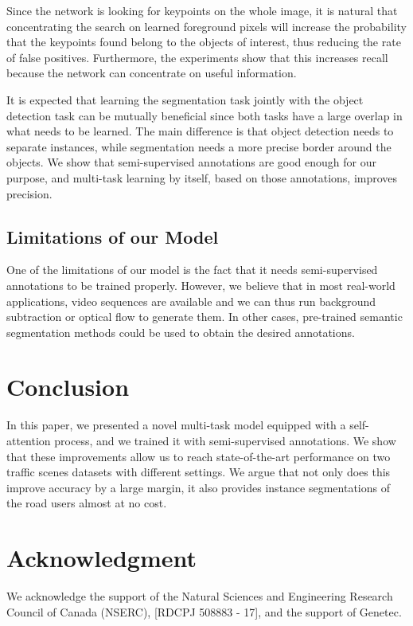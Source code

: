 \documentclass[10pt, conference, compsocconf]{IEEEtran}
\begin{document}
Since the network is looking for keypoints on the whole image, it is natural that concentrating the search on learned foreground pixels will increase the probability that the keypoints found belong to the objects of interest, thus reducing the rate of false positives. Furthermore, the experiments show that this increases recall because the network can concentrate on useful information.  

It is expected that learning the segmentation task jointly with the object detection task can be mutually beneficial since both tasks have a large overlap in what needs to be learned. The main difference is that object detection needs to separate instances, while segmentation needs a more precise border around the objects. We show that semi-supervised annotations are good enough for our purpose, and multi-task learning by itself, based on those annotations, improves precision. 

\subsection{Limitations of our Model}

 One of the limitations of our model is the fact that it needs semi-supervised annotations to be trained properly. However, we believe that in most real-world applications, video sequences are available and we can thus run background subtraction or optical flow to generate them. In other cases, pre-trained semantic segmentation methods could be used to obtain the desired annotations. 

\section{Conclusion}

In this paper, we presented a novel multi-task model equipped with a self-attention process, and we trained it with semi-supervised annotations. We show that these improvements allow us to reach state-of-the-art performance on two traffic scenes datasets with different settings. We argue that not only does this improve accuracy by a large margin, it also provides instance segmentations of the road users almost at no cost. 

\section*{Acknowledgment}
We acknowledge the support of the Natural Sciences and Engineering Research Council of Canada (NSERC), [RDCPJ 508883 - 17], and the support of Genetec.



\end{document}
